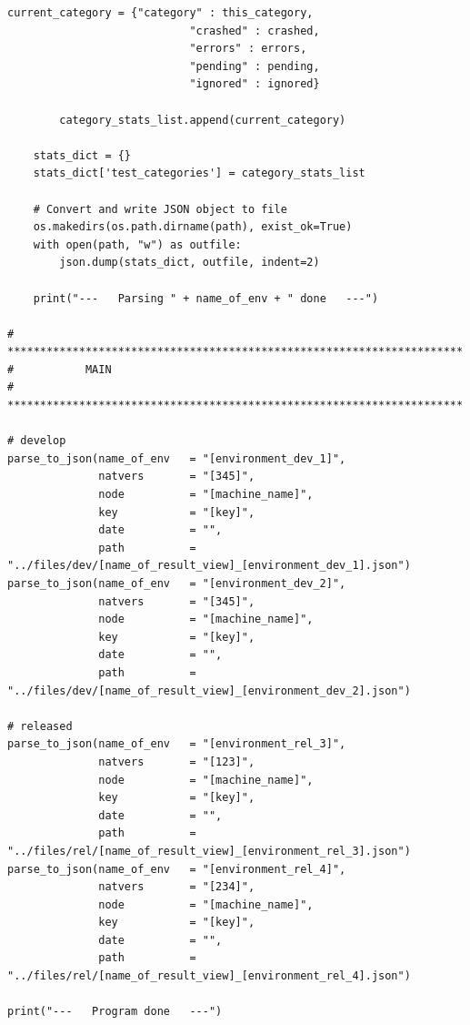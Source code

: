 \begin{lstlisting}[breaklines]
        current_category = {"category" : this_category,
                            "crashed" : crashed,
                            "errors" : errors,
                            "pending" : pending,
                            "ignored" : ignored}
        
        category_stats_list.append(current_category)

    stats_dict = {}
    stats_dict['test_categories'] = category_stats_list

    # Convert and write JSON object to file
    os.makedirs(os.path.dirname(path), exist_ok=True)
    with open(path, "w") as outfile: 
        json.dump(stats_dict, outfile, indent=2)

    print("---   Parsing " + name_of_env + " done   ---")

# **********************************************************************
#           MAIN
# **********************************************************************

# develop
parse_to_json(name_of_env   = "[environment_dev_1]",
              natvers       = "[345]",
              node          = "[machine_name]",
              key           = "[key]",
              date          = "",
              path          = "../files/dev/[name_of_result_view]_[environment_dev_1].json")
parse_to_json(name_of_env   = "[environment_dev_2]",
              natvers       = "[345]",
              node          = "[machine_name]",
              key           = "[key]",
              date          = "",
              path          = "../files/dev/[name_of_result_view]_[environment_dev_2].json")

# released
parse_to_json(name_of_env   = "[environment_rel_3]",
              natvers       = "[123]",
              node          = "[machine_name]",
              key           = "[key]",
              date          = "",
              path          = "../files/rel/[name_of_result_view]_[environment_rel_3].json")
parse_to_json(name_of_env   = "[environment_rel_4]",
              natvers       = "[234]",
              node          = "[machine_name]",
              key           = "[key]",
              date          = "",
              path          = "../files/rel/[name_of_result_view]_[environment_rel_4].json")

print("---   Program done   ---")
\end{lstlisting}
